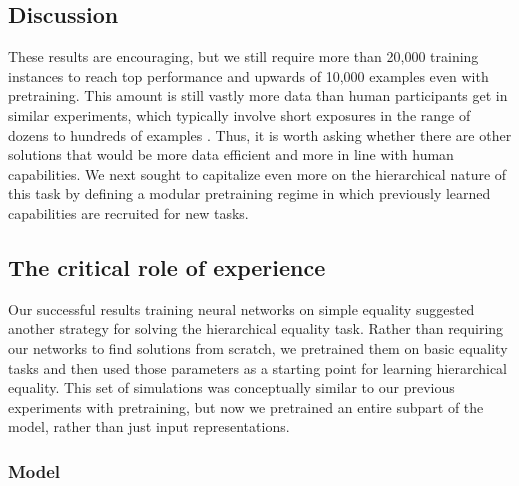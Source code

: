 \documentclass{article}
\renewcommand{\cite}{\citep}
\begin{document}
\subsection{Discussion}

These results are encouraging, but we still require more than 20,000 training instances to reach top performance and upwards of 10,000 examples even with pretraining. This amount is still vastly more data than human participants get in similar experiments, which typically involve short exposures in the range of dozens to hundreds of examples \cite[e.g.,][]{marcus:1999,endress2005}. Thus, it is worth asking whether there are other solutions that would be more data efficient and more in line with human capabilities. We next sought to capitalize even more on the hierarchical nature of this task by defining a modular pretraining regime in which previously learned capabilities are recruited for new tasks.

\subsection{The critical role of experience}\label{sec:modular}

Our successful results training neural networks on simple equality suggested another strategy for solving the hierarchical equality task. Rather than requiring our networks to find solutions from scratch, we pretrained them on basic equality tasks and then used those parameters as a starting point for learning hierarchical equality. This set of simulations was conceptually similar to our previous experiments with pretraining, but now we pretrained an entire subpart of the model, rather than just input representations.

\subsubsection{Model}
\end{document}
